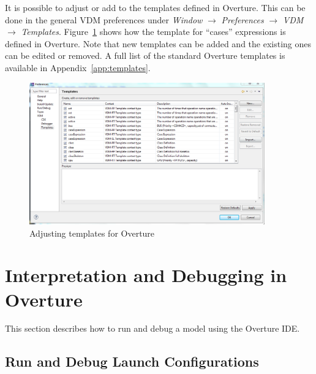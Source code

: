 \documentclass{overturerepchap}
\begin{document}
It is possible to adjust or add to the templates defined in 
Overture. This can be done in the general VDM preferences under
\emph{Window} $\rightarrow$ \emph{Preferences} $\rightarrow$ \emph{VDM}
$\rightarrow$ \emph{Templates}. Figure~\ref{fig:Templatepreferences} shows
how the template for ``cases'' expressions is defined in Overture. Note
that new templates can be added and the existing ones can be
edited or removed. A full list of the
standard Overture templates is available in Appendix~\ref{app:templates}.

\begin{figure}
\begin{center}
\includegraphics[width=4in]{screenDumps/templatesRT}
\caption{Adjusting templates for Overture}
\label{fig:Templatepreferences}
\end{center}
\end{figure}

\chapter{Interpretation and Debugging in Overture}\label{sec:debug}

This section describes how to run and debug a model using the Overture IDE. 

\section{Run and Debug Launch Configurations}\label{sec:launchmodes}
\end{document}
